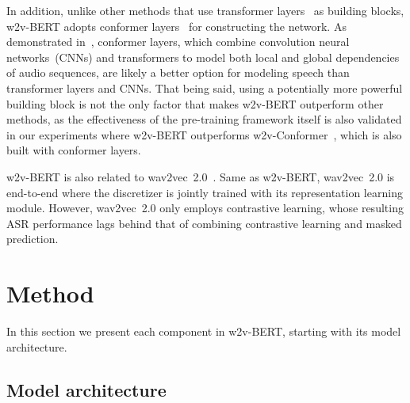 \documentclass{article}
\begin{document}
In addition, unlike other methods that use transformer layers~\cite{vaswani2017attention} as building blocks, w2v-BERT adopts conformer layers~\cite{gulati2020conformer} for constructing the network.
As demonstrated in~\cite{gulati2020conformer}, conformer layers, which combine convolution neural networks~(CNNs) and transformers to model both local and global dependencies of audio sequences, are likely a better option for modeling speech than transformer layers and CNNs.
That being said, using a potentially more powerful building block is not the only factor that makes w2v-BERT outperform other methods, as the effectiveness of the pre-training framework itself is also validated in our experiments where w2v-BERT outperforms w2v-Conformer~\cite{zhang2020pushing}, which is also built with conformer layers.

w2v-BERT is also related to wav2vec~2.0~\cite{baevski2020wav2vec}.
Same as w2v-BERT, wav2vec~2.0 is end-to-end where the discretizer is jointly trained with its representation learning module.
However, wav2vec~2.0 only employs contrastive learning, whose resulting ASR performance lags behind that of combining contrastive learning and masked prediction.


\section{Method}
\label{sec:method}
In this section we present each component in w2v-BERT, starting with its model architecture.

\subsection{Model architecture}
\end{document}
